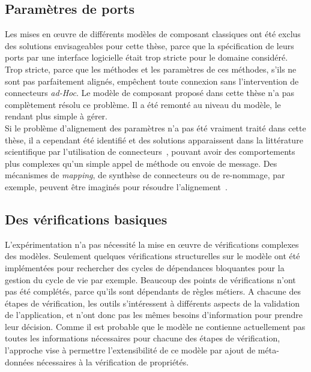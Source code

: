 \subsection{Paramètres de ports}
Les mises en \oe uvre de différents modèles de composant classiques ont été exclus des solutions envisageables pour cette thèse, parce que la spécification de leurs ports par une interface logicielle était trop stricte pour le domaine considéré. Trop stricte, parce que les méthodes et les paramètres de ces méthodes, s'ils ne sont pas parfaitement alignés, empêchent toute connexion sans l'intervention de connecteurs {\it ad-Hoc}. Le modèle de composant proposé dans cette thèse n'a pas complètement résolu ce problème. Il a été remonté au niveau du modèle, le rendant plus simple à gérer.\\
Si le problème d'alignement des paramètres n'a pas été vraiment traité dans cette thèse, il a cependant été identifié et des solutions apparaissent dans la littérature scientifique par l'utilisation de connecteurs~\cite{Matougui:2005}, pouvant avoir des comportements plus complexes qu'un simple appel de méthode ou envoie de message. Des mécanismes de {\it mapping}, de synthèse de connecteurs ou de re-nommage, par exemple, peuvent être imaginés pour résoudre l'alignement~\cite{Clavreul:2010}.



\subsection{Des vérifications basiques}
L'expérimentation n'a pas nécessité la mise en \oe uvre de vérifications complexes des modèles. Seulement quelques vérifications structurelles sur le modèle ont été implémentées pour rechercher des cycles de dépendances bloquantes pour la gestion du cycle de vie par exemple. Beaucoup des points de vérifications n'ont pas été complétés, parce qu'ils sont dépendants de règles métiers. A chacune des étapes de vérification, les outils s'intéressent à différents aspects de la validation de l'application, et n'ont donc pas les mêmes besoins d'information pour prendre leur décision. Comme il est probable que le modèle ne contienne actuellement pas toutes les informations nécessaires pour chacune des étapes de vérification,  l'approche vise à permettre l'extensibilité de ce modèle par ajout de méta-données nécessaires à la vérification de propriétés. 


